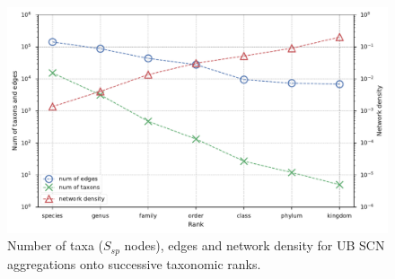 \begin{figure}[!ht]
  	\centering
    \includegraphics[width=\linewidth]{figures/casestudy_ub/scn_tax_agg_curves.pdf}
    \caption{ Number of taxa ($S_{sp}$ nodes), edges and network density for UB SCN aggregations onto successive taxonomic ranks. }
    \label{fig:ub_scn_tax_agg_curves}
  \end{figure}

